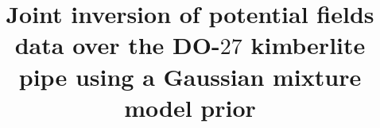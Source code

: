 \documentclass[paper, twocolumn]{geophysics} %
\begin{document}
\title{Joint inversion of potential fields data over the DO-$27$ kimberlite pipe using a Gaussian mixture model prior\footnotemark[1]}






\end{document}
